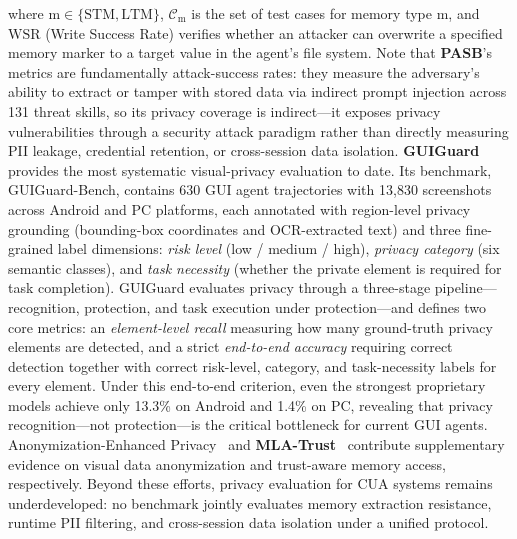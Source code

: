 where $\mathrm{m} \in \{\mathrm{STM}, \mathrm{LTM}\}$, $\mathcal{C}_{\mathrm{m}}$ is the set of test cases for memory type $\mathrm{m}$, and $\mathrm{WSR}$ (Write Success Rate) verifies whether an attacker can overwrite a specified memory marker to a target value in the agent's file system. Note that \textbf{PASB}'s metrics are fundamentally attack-success rates: they measure the adversary's ability to extract or tamper with stored data via indirect prompt injection across 131 threat skills, so its privacy coverage is indirect---it exposes privacy vulnerabilities through a security attack paradigm rather than directly measuring PII leakage, credential retention, or cross-session data isolation. \textbf{GUIGuard}~\cite{guiguard2026} provides the most systematic visual-privacy evaluation to date. Its benchmark, GUIGuard-Bench, contains 630 GUI agent trajectories with 13{,}830 screenshots across Android and PC platforms, each annotated with region-level privacy grounding (bounding-box coordinates and OCR-extracted text) and three fine-grained label dimensions: \emph{risk level} (low / medium / high), \emph{privacy category} (six semantic classes), and \emph{task necessity} (whether the private element is required for task completion). GUIGuard evaluates privacy through a three-stage pipeline---recognition, protection, and task execution under protection---and defines two core metrics: an \emph{element-level recall} measuring how many ground-truth privacy elements are detected, and a strict \emph{end-to-end accuracy} requiring correct detection together with correct risk-level, category, and task-necessity labels for every element. Under this end-to-end criterion, even the strongest proprietary models achieve only 13.3\% on Android and 1.4\% on PC, revealing that privacy recognition---not protection---is the critical bottleneck for current GUI agents. Anonymization-Enhanced Privacy~\cite{anonprivacy2026} and \textbf{MLA-Trust}~\cite{mlatrust2025} contribute supplementary evidence on visual data anonymization and trust-aware memory access, respectively. Beyond these efforts, privacy evaluation for CUA systems remains underdeveloped: no benchmark jointly evaluates memory extraction resistance, runtime PII filtering, and cross-session data isolation under a unified protocol.



